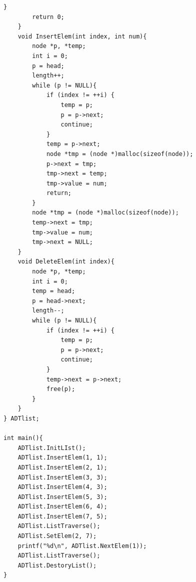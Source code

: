 \documentclass[a4paper,11pt,UTF8]{ctexart}
\begin{document}
\begin{lstlisting}[caption=1Linked\_list.cpp,captionpos=b]
        }
        return 0;
    }
    void InsertElem(int index, int num){
        node *p, *temp;
        int i = 0;
        p = head;
        length++;
        while (p != NULL){
            if (index != ++i) {
                temp = p;
                p = p->next;
                continue;
            }
            temp = p->next;
            node *tmp = (node *)malloc(sizeof(node));
            p->next = tmp;
            tmp->next = temp;
            tmp->value = num;
            return;
        }
        node *tmp = (node *)malloc(sizeof(node));
        temp->next = tmp;
        tmp->value = num;
        tmp->next = NULL;
    }
    void DeleteElem(int index){
        node *p, *temp;
        int i = 0;
        temp = head;
        p = head->next;
        length--;
        while (p != NULL){
            if (index != ++i) {
                temp = p;
                p = p->next;
                continue;
            }
            temp->next = p->next;
            free(p);
        }
    }
} ADTlist;

int main(){
    ADTlist.InitLIst();
    ADTlist.InsertElem(1, 1);
    ADTlist.InsertElem(2, 1);
    ADTlist.InsertElem(3, 3);
    ADTlist.InsertElem(4, 3);
    ADTlist.InsertElem(5, 3);
    ADTlist.InsertElem(6, 4);
    ADTlist.InsertElem(7, 5);
    ADTlist.ListTraverse();
    ADTlist.SetElem(2, 7);
    printf("%d\n", ADTlist.NextElem(1));
    ADTlist.ListTraverse();
    ADTlist.DestoryList();
}
\end{lstlisting}
\end{document}
